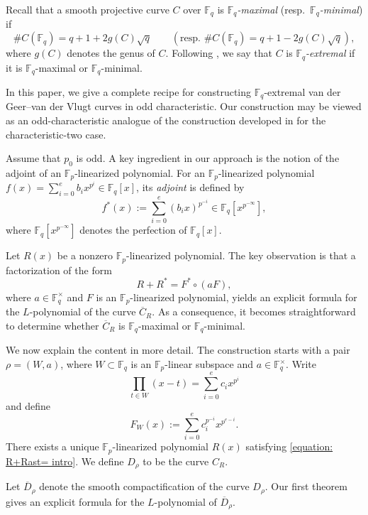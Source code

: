 \documentclass[12pt,a4paper]{amsart}
\theoremstyle{definition}
\def\F{{\mathbb F}}
\theoremstyle{remark}
\begin{document}
Recall that a smooth projective curve $C$ over $\F_q$ is 
\textit{$\F_q$-maximal} (resp.\ \textit{$\F_q$-minimal}) if 
\[
\# C(\F_q)=q+1+2 g(C) \sqrt{q}
\qquad \left(\textrm{resp.\ } \# C(\F_q)=q+1-2 g(C) \sqrt{q}\right), 
\]
where $g(C)$ denotes the genus of $C$. Following \cite{ITT1}, 
we say that $C$ is \textit{$\F_q$-extremal} if it is $\F_q$-maximal or $\F_q$-minimal. 

In this paper, we give a complete recipe for constructing $\F_q$-extremal van der Geer--van der Vlugt curves in odd characteristic.
Our construction may be viewed as an odd-characteristic analogue of the construction developed in \cite{ITT1} for the characteristic-two case.




Assume that $p_0$ is odd. A key ingredient in our approach is the notion of the adjoint of an
$\F_p$-linearized polynomial. 
For an $\F_p$-linearized polynomial 
$f(x)=\sum_{i=0}^e b_i x^{p^i} \in \F_q[x]$, 
its \emph{adjoint} is defined by  
\[
f^\ast(x):=\sum_{i=0}^e (b_i x)^{p^{-i}}
\in \F_q[x^{p^{-\infty}}], 
\]
where $\F_q[x^{p^{-\infty}}]$ denotes the perfection of 
$\F_q[x]$. 

Let $R(x)$ be a nonzero $\F_p$-linearized polynomial. The key observation is that a factorization of the form 
\begin{equation}\label{equation: R+Rast= intro}
    R+R^\ast=F^\ast\circ (aF), 
\end{equation}
where $a\in \F_q^\times$ and $F$ is an $\F_p$-linearized polynomial, yields an explicit formula for the $L$-polynomial of the curve $\overline{C}_R$. As a consequence, it becomes straightforward to determine whether
$\overline{C}_R$ is $\F_q$-maximal or $\F_q$-minimal. 


\medskip

We now explain the content in more detail. The construction starts with a pair $\rho=(W,a)$, where $W\subset \F_q$ is an $\F_p$-linear subspace  and $a\in \F_q^\times$. 
Write 
\[\prod_{t \in W} (x-t)=\sum_{i=0}^e c_i x^{p^i}\] and 
define 
\[F_W(x):=\sum_{i=0}^e c_i^{p^{-i}} x^{p^{e-i}}. \]
There exists a unique $\F_p$-linearized polynomial 
$R(x)$ satisfying 
\eqref{equation: R+Rast= intro}. 
We define $D_{\rho}$ to be the curve $C_R$. 

Let $\overline{D}_\rho$ denote the smooth compactification of the curve $D_\rho$. Our first theorem gives an explicit formula for the
$L$-polynomial of $\overline{D}_\rho$. 
\end{document}
